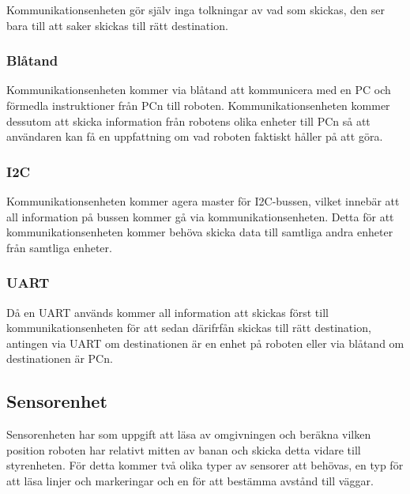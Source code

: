 \documentclass[a4paper,12pt]{article}
\begin{document}
Kommunikationsenheten gör själv inga tolkningar av vad som skickas, den ser bara
till att saker skickas till rätt destination.
\subsubsection{Blåtand}
Kommunikationsenheten kommer via blåtand att kommunicera med en PC och förmedla
instruktioner från PCn till roboten. Kommunikationsenheten kommer dessutom att
skicka information från robotens olika enheter till PCn så att användaren kan få
en uppfattning om vad roboten faktiskt håller på att göra.
\subsubsection{I2C}
Kommunikationsenheten kommer agera master för I2C-bussen, vilket innebär att all
information på bussen kommer gå via kommunikationsenheten. Detta för att
kommunikationsenheten kommer behöva skicka data till samtliga andra enheter från
samtliga enheter.
\subsubsection{UART}
Då en UART används kommer all information att skickas först till
kommunikationsenheten för att sedan därifrfån skickas till rätt destination,
antingen via UART om destinationen är en enhet på roboten eller via blåtand om
destinationen är PCn.


\subsection{Sensorenhet}
Sensorenheten har som uppgift att läsa av omgivningen och beräkna vilken position roboten har relativt mitten av banan och skicka detta vidare till styrenheten. För detta kommer två olika typer av sensorer att behövas, en typ för att läsa linjer och markeringar och en för att bestämma avstånd till väggar.
\end{document}

